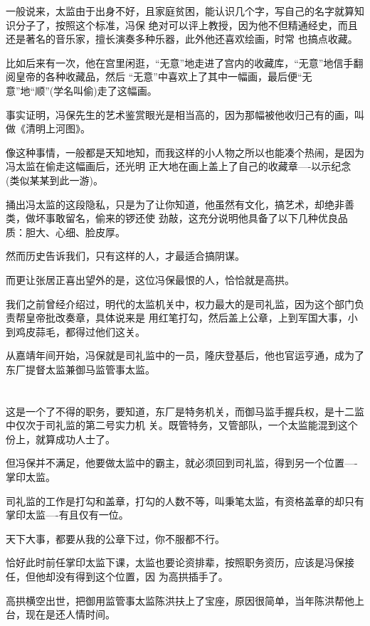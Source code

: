 \documentclass[11pt,a4paper,onecolumn]{article}
\begin{document}
一般说来，太监由于出身不好，且家庭贫困，能认识几个字，写自己的名字就算知识分子了，按照这个标准，冯保
绝对可以评上教授，因为他不但精通经史，而且还是著名的音乐家，擅长演奏多种乐器，此外他还喜欢绘画，时常
也搞点收藏。

比如后来有一次，他在宫里闲逛，``无意''地走进了宫内的收藏库，``无意''地信手翻阅皇帝的各种收藏品，然后
``无意''中喜欢上了其中一幅画，最后便``无意''地``顺''(学名叫偷)走了这幅画。

事实证明，冯保先生的艺术鉴赏眼光是相当高的，因为那幅被他收归己有的画，叫做《清明上河图》。

像这种事情，一般都是天知地知，而我这样的小人物之所以也能凑个热闹，是因为冯太监在偷走这幅画后，还光明
正大地在画上盖上了自己的收藏章----以示纪念(类似某某到此一游)。

捅出冯太监的这段隐私，只是为了让你知道，他虽然有文化，搞艺术，却绝非善类，做坏事敢留名，偷来的锣还使
劲敲，这充分说明他具备了以下几种优良品质：胆大、心细、脸皮厚。

然而历史告诉我们，只有这样的人，才最适合搞阴谋。

而更让张居正喜出望外的是，这位冯保最恨的人，恰恰就是高拱。

我们之前曾经介绍过，明代的太监机关中，权力最大的是司礼监，因为这个部门负责帮皇帝批改奏章，具体说来是
用红笔打勾，然后盖上公章，上到军国大事，小到鸡皮蒜毛，都得过他们这关。

从嘉靖年间开始，冯保就是司礼监中的一员，隆庆登基后，他也官运亨通，成为了东厂提督太监兼御马监管事太监。

\section[\thesection]{}

这是一个了不得的职务，要知道，东厂是特务机关，而御马监手握兵权，是十二监中仅次于司礼监的第二号实力机
关。既管特务，又管部队，一个太监能混到这个份上，就算成功人士了。

但冯保并不满足，他要做太监中的霸主，就必须回到司礼监，得到另一个位置----掌印太监。

司礼监的工作是打勾和盖章，打勾的人数不等，叫秉笔太监，有资格盖章的却只有掌印太监----有且仅有一位。

天下大事，都要从我的公章下过，你不服都不行。

恰好此时前任掌印太监下课，太监也要论资排辈，按照职务资历，应该是冯保接任，但他却没有得到这个位置，因
为高拱插手了。

高拱横空出世，把御用监管事太监陈洪扶上了宝座，原因很简单，当年陈洪帮他上台，现在是还人情时间。
\end{document}
